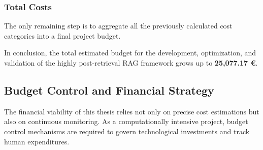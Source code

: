 \subsubsection{Total Costs}
\label{subsubsec:total-costs}

The only remaining step is to aggregate all the previously calculated cost categories into a final project budget. 

\begin{table}[H]
\centering
\caption{Final aggregation of the project's financial budget, combining direct and indirect costs, operational expenses, and risk mitigation costs.}
\label{tab:grand-total-budget}
\end{table}

In conclusion, the total estimated budget for the development, optimization, and validation of the highly post-retrieval RAG framework grows up to \textbf{25,077.17 \euro}. 








\subsection{Budget Control and Financial Strategy}
\label{subsec:management-control}

The financial viability of this thesis relies not only on precise cost estimations but also on continuous monitoring. As a computationally intensive project, budget control mechanisms are required to govern technological investments and track human expenditures.

